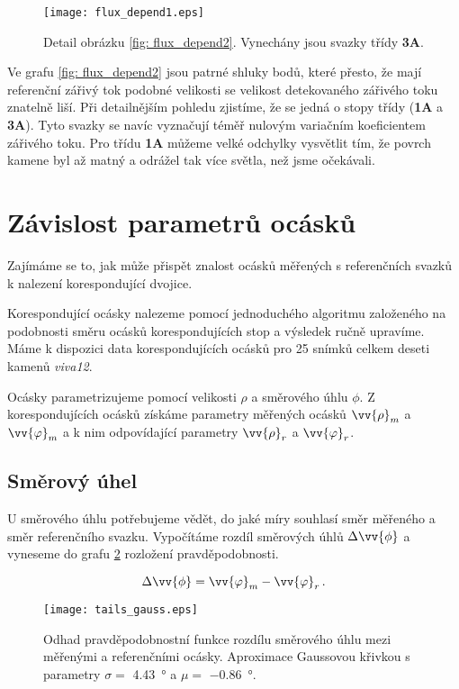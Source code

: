 \begin{figure}[htps]
\centering
\texttt{[image: flux\_depend1.eps]}
\caption{Detail obrázku \ref{fig: flux_depend2}. Vynechány jsou svazky třídy \textbf{3A}.}
\label{fig: flux_depend1}
\end{figure}


Ve grafu \ref{fig: flux_depend2} jsou patrné shluky bodů, které přesto, že mají referenční zářivý tok podobné velikosti se velikost detekovaného zářivého toku znatelně liší. Při detailnějším pohledu zjistíme, že se jedná o stopy třídy (\textbf{1A} a \textbf{3A}). Tyto svazky se navíc vyznačují téměř nulovým variačním koeficientem zářivého toku. Pro třídu \textbf{1A} můžeme velké odchylky vysvětlit tím, že povrch kamene byl až matný a  odrážel tak více světla, než jsme očekávali. 

\section{Závislost parametrů ocásků}

	Zajímáme se to, jak může přispět znalost ocásků měřených s referenčních svazků k nalezení korespondující dvojice.  

  Korespondující ocásky nalezeme pomocí jednoduchého algoritmu založeného na podobnosti směru ocásků korespondujících stop a výsledek ručně upravíme. Máme k dispozici data korespondujících ocásků pro 25 snímků celkem deseti kamenů \textit{viva12}. 
	
	Ocásky parametrizujeme pomocí velikosti $\rho$ a směrového úhlu $\phi$. Z korespondujících ocásků získáme parametry měřených ocásků $\vv{\rho}_m$ a $\vv{\varphi}_m$ a k nim odpovídající parametry $\vv{\rho}_r$ a $\vv{\varphi}_r$.
	

\subsection{Směrový úhel}
 U směrového úhlu potřebujeme vědět, do jaké míry souhlasí směr měřeného a směr referenčního svazku. Vypočítáme rozdíl směrových úhlů $\Delta\vv{\phi}$ a vyneseme do grafu \ref{fig: tail_depend1} rozložení pravděpodobnosti.  
 
 \begin{equation}
 \Delta\vv{\phi} = \vv{\varphi}_m - \vv{\varphi}_r\,.
 \end{equation}
  
\begin{figure}[htps]
\centering
\texttt{[image: tails\_gauss.eps]}
\caption{Odhad pravděpodobnostní funkce rozdílu směrového úhlu mezi měřenými a referenčními ocásky. Aproximace Gaussovou křivkou s parametry $\sigma = $ \SI{4.43}{\degree} a $\mu = $ \SI{-0.86}{\degree}. }
\label{fig: tail_depend1}
\end{figure}


